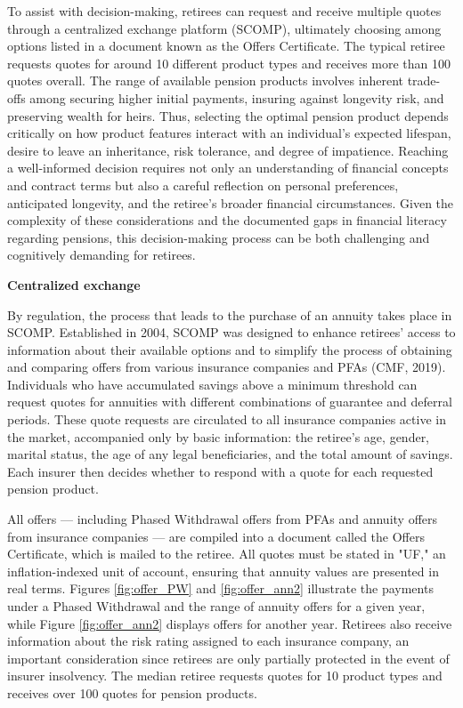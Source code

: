 \documentclass[12pt]{article}
\theoremstyle{plain}
\theoremstyle{plain}
\begin{document}
To assist with decision-making, retirees can request and receive multiple quotes through a centralized exchange platform (SCOMP), ultimately choosing among options listed in a document known as the Offers Certificate. The typical retiree requests quotes for around 10 different product types and receives more than 100 quotes overall.
The range of available pension products involves inherent trade-offs among securing higher initial payments, insuring against longevity risk, and preserving wealth for heirs. Thus, selecting the optimal pension product depends critically on how product features interact with an individual's expected lifespan, desire to leave an inheritance, risk tolerance, and degree of impatience. Reaching a well-informed decision requires not only an understanding of financial concepts and contract terms but also a careful reflection on personal preferences, anticipated longevity, and the retiree’s broader financial circumstances. Given the complexity of these considerations and the documented gaps in financial literacy regarding pensions, this decision-making process can be both challenging and cognitively demanding for retirees.



\textbf{Centralized exchange}

By regulation, the process that leads to the purchase of an annuity takes place in SCOMP.  Established in 2004, SCOMP was designed to enhance retirees' access to information about their available options and to simplify the process of obtaining and comparing offers from various insurance companies and PFAs (CMF, 2019). Individuals who have accumulated savings above a minimum threshold can request quotes for annuities with different combinations of guarantee and deferral periods. These quote requests are circulated to all insurance companies active in the market, accompanied only by basic information: the retiree’s age, gender, marital status, the age of any legal beneficiaries, and the total amount of savings. Each insurer then decides whether to respond with a quote for each requested pension product.

 
 

 All offers — including Phased Withdrawal offers from PFAs and annuity offers from insurance companies — are compiled into a  document called the Offers Certificate, which is mailed to the retiree. All quotes must be stated in "UF," an inflation-indexed unit of account, ensuring that annuity values are presented in real terms. Figures \ref{fig:offer_PW} and \ref{fig:offer_ann2} illustrate the payments under a Phased Withdrawal and the range of annuity offers for a given year, while Figure \ref{fig:offer_ann2} displays offers for another year. Retirees also receive information about the risk rating assigned to each insurance company, an important consideration since retirees are only partially protected in the event of insurer insolvency. The median retiree requests quotes for 10 product types and receives over 100 quotes for pension products.  
\end{document}
